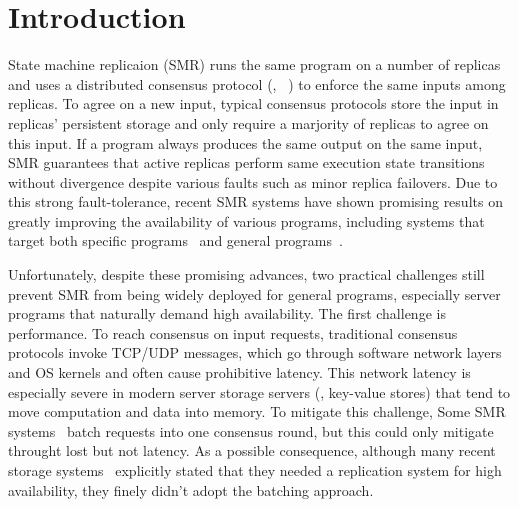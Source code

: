 \section{Introduction} \label{sec:intro}

State machine replicaion (SMR) runs the same program on a 
number of replicas and uses a distributed consensus protocol (\eg, 
\paxos~\cite{crane:sosp15}) to enforce the same inputs among 
replicas. To agree on a new input, typical consensus protocols store the input 
in replicas' persistent storage and only require a marjority of replicas to 
agree on this input. If a program always produces the same output on the same 
input, SMR guarantees that active replicas perform same execution state 
transitions without divergence despite various faults such as minor replica 
failovers. Due to this strong fault-tolerance, recent SMR 
systems have shown promising results on greatly improving the availability of 
various programs, including systems that target both specific 
programs~\cite{chubby:osdi, zookeeper} and general 
programs~\cite{crane:sosp15,eve:osdi12,rex:eurosys14}.

Unfortunately, despite these promising advances, two practical challenges still 
prevent SMR from being widely deployed for general programs, especially 
server programs that naturally demand high availability. The first challenge is 
performance. To reach consensus on input requests, traditional consensus 
protocols invoke TCP/UDP messages, which go through software network layers 
and OS kernels and often cause prohibitive latency. This network latency is 
especially severe in modern server storage servers (\eg, key-value stores) that 
tend to move computation and data into memory. To mitigate this challenge, Some 
SMR systems~\cite{calvin:sigmod12,rex:eusorys14} batch requests into one 
consensus round, but this could only mitigate throught lost but not latency. As 
a possible consequence, although many recent storage systems~\cite{drtm} 
explicitly stated that they needed a replication system for high availability, 
they finely didn't adopt the batching approach.

